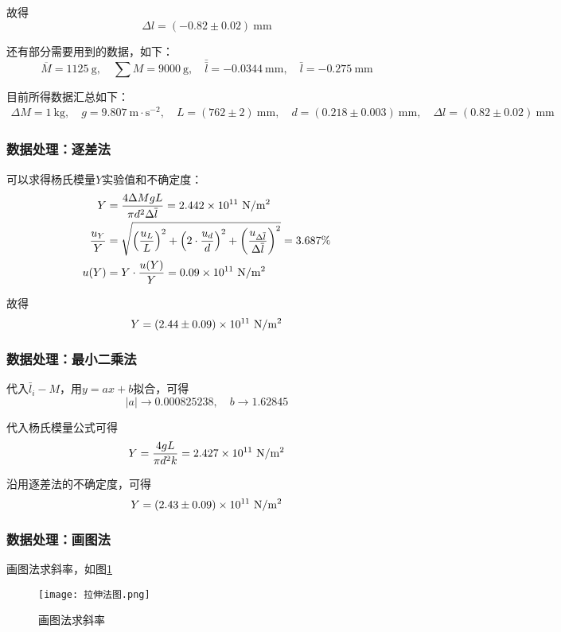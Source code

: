 \documentclass[11pt]{article}
\begin{document}
	故得
	\[\Delta l=(-0.82 \pm 0.02) \ \mathrm{mm}\]
	
	还有部分需要用到的数据，如下：
	\begin{equation*}
		\overline{M} = 1125 \ \mathrm{g},\quad \sum M = 9000 \ \mathrm{g} ,\quad \bar{\bar{l}} = -0.0344 \ \mathrm{mm},\quad \bar{l} = -0.275 \ \mathrm{mm}
	\end{equation*}
	
	目前所得数据汇总如下：
	\begin{gather*}
		\Delta M = 1\ \mathrm{kg},\quad g = 9.807 \ \mathrm{m\cdot s^{-2}},\quad L = (762 \pm 2) \ \mathrm{mm},\quad d = (0.218 \pm 0.003) \ \mathrm{mm},\quad \Delta l = (0.82 \pm 0.02 ) \ \mathrm{mm}
	\end{gather*}
	
	\subsubsection{数据处理：逐差法}
	可以求得杨氏模量$Y$实验值和不确定度：
	\begin{align*}
		Y&=\frac{4\Delta M gL}{\pi d^2\Delta \overline l}=2.442\times 10^{11}\,\,{\rm N/m^2}\\
		\frac{u_Y}{Y}&=\sqrt{\left(\frac{u_L}{L}\right)^2
			+\left(2\cdot\frac{u_d}{d}\right)^2+\left(\frac{u_{\Delta \overline l}}{\Delta \overline l}\right)^2}
		=3.687\%
		\\ u(Y)&=Y\cdot\frac{u(Y)}{Y}=0.09\times10^{11}\,\,{\rm N/m^2}
	\end{align*}
	
	故得
	\[Y=(2.44 \pm 0.09)\times10^{11}\,\,{\rm N/m^2}\]
	
	\subsubsection{数据处理：最小二乘法}
	代入$\bar{l}_i-M$，用$y=a x +b$拟合，可得
	\[|a| \to 0.000825238,\quad b \to 1.62845\]
	
	代入杨氏模量公式可得
	\[Y= \frac{4gL}{\pi d^2k}=2.427\times10^{11}\,\,{\rm N/m^2}\]
	
	沿用逐差法的不确定度，可得
	\[Y=(2.43 \pm 0.09)\times10^{11}\,\,{\rm N/m^2}\]
	
	\subsubsection{数据处理：画图法}
	
	画图法求斜率，如图\ref{fig:1}
	\begin{figure}[H]
		\centering
		\texttt{[image: 拉伸法图.png]}
		\caption{画图法求斜率}
		\label{fig:1}
	\end{figure}
	
\end{document}
